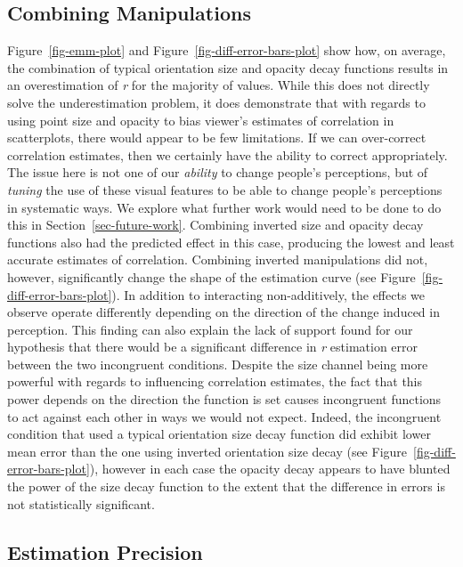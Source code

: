 \documentclass[manuscript, review, anonymous, screen]{acmart}
\begin{document}
\hypertarget{sec-combining}{%
\subsection{Combining Manipulations}\label{sec-combining}}

Figure~\ref{fig-emm-plot} and Figure~\ref{fig-diff-error-bars-plot} show
how, on average, the combination of typical orientation size and opacity
decay functions results in an overestimation of \emph{r} for the
majority of values. While this does not directly solve the
underestimation problem, it does demonstrate that with regards to using
point size and opacity to bias viewer's estimates of correlation in
scatterplots, there would appear to be few limitations. If we can
over-correct correlation estimates, then we certainly have the ability
to correct appropriately. The issue here is not one of our
\emph{ability} to change people's perceptions, but of \emph{tuning} the
use of these visual features to be able to change people's perceptions
in systematic ways. We explore what further work would need to be done
to do this in Section~\ref{sec-future-work}. Combining inverted size and
opacity decay functions also had the predicted effect in this case,
producing the lowest and least accurate estimates of correlation.
Combining inverted manipulations did not, however, significantly change
the shape of the estimation curve (see
Figure~\ref{fig-diff-error-bars-plot}). In addition to interacting
non-additively, the effects we observe operate differently depending on
the direction of the change induced in perception. This finding can also
explain the lack of support found for our hypothesis that there would be
a significant difference in \emph{r} estimation error between the two
incongruent conditions. Despite the size channel being more powerful
with regards to influencing correlation estimates, the fact that this
power depends on the direction the function is set causes incongruent
functions to act against each other in ways we would not expect. Indeed,
the incongruent condition that used a typical orientation size decay
function did exhibit lower mean error than the one using inverted
orientation size decay (see Figure~\ref{fig-diff-error-bars-plot}),
however in each case the opacity decay appears to have blunted the power
of the size decay function to the extent that the difference in errors
is not statistically significant.

\hypertarget{estimation-precision}{%
\subsection{Estimation Precision}\label{estimation-precision}}
\end{document}
